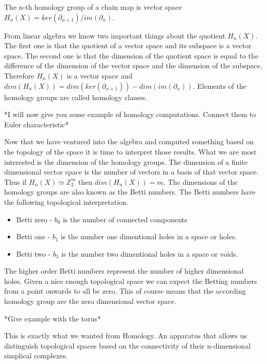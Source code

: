 \begin{defn} The n-th homology group of a chain map is vector space $H_n(X) = ker(\partial_{n+1})\big/im(\partial_n)$. \end{defn}

From linear algebra \cite{lin-alg-done-right} we know two important things about the quotient $H_n(X)$. The first one is that the quotient of a vector space and its subspace is a vector space. The second one is that the dimension of the quotient space is equal to the difference of the dimension of the vector space and the dimension of the subspace. Therefore $H_n(X)$ is a vector space and $dim(H_n(X)) = dim(ker(\partial_{n+1})) - dim(im(\partial_n))$. Elements of the homology groups are called homology classes.

*I will now give you some example of homology computations. Connect them to Euler characteristic*

Now that we have ventured into the algebra and computed something based on the topology of the space it is time to interpret those results. 
What we are most interested is the dimension of the homology groups. The dimension of a finite dimensional vector space is the number of vectors in a basis of that vector space. Thus if $H_n(X) \simeq \mathbb{Z}_2^m$ then $dim(H_n(X)) = m$. The dimensions of the homology groups are also known as the Betti numbers. The Betti numbers have the following topological interpretation.


\begin{itemize}
    \item Betti zero - $b_0$ is the number of connected components
    \item Betti one - $b_1$ is the number one dimentional holes in a space or holes.
    \item Betti two - $b_3$ is the number two dimentional holes in a space or voids.
\end{itemize}


The higher order Betti numbers represent the number of higher dimensional holes. Given a nice enough topological space we can expect the Betting numbers from a point onwards to all be zero. This of course means that the according homology group are the zero dimensional vector space.

*Give example with the torus*

This is exactly what we wanted from Homology. An apparatus that allows us distinguish topological spaces based on the connectivity of their n-dimensional simplical complexes.

